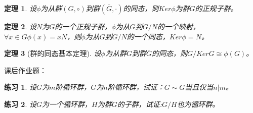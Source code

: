 \documentclass{article}
\newtheorem{Thm}{定理}
\newtheorem{Exercise}{练习}
\begin{document}
\begin{CJK*}{UTF8}{gbsn}
\begin{Thm}
  设$\phi$为从群$(G,\circ)$到群$(\bar{G},\cdot)$的同态，则$Ker \phi$为群$G$的正规子群。
\end{Thm}

\begin{Thm}
设$N$为$G$的一个正规子群，$\phi$为从$G$到$G/N$的一个映射，$\forall x\in G \phi(x)=xN$，则$\phi$为从$G$到$G/N$的一个同态，$Ker \phi=N$。
\end{Thm}

\begin{Thm}[群的同态基本定理]
设$\phi$为从群$G$到群$\bar{G}$的同态，则$G/Ker G \cong \phi(G)$。
\end{Thm}

课后作业题：
\begin{Exercise}
设$G$为$m$阶循环群，$\bar{G}$为$n$阶循环群，试证：$G \sim \bar{G}$当且仅当$n | m$。
\end{Exercise}

\begin{Exercise}
设$G$为一个循环群，$H$为群$G$的子群，试证:$G/H$也为循环群。
\end{Exercise}
\end{CJK*}
\end{document}
